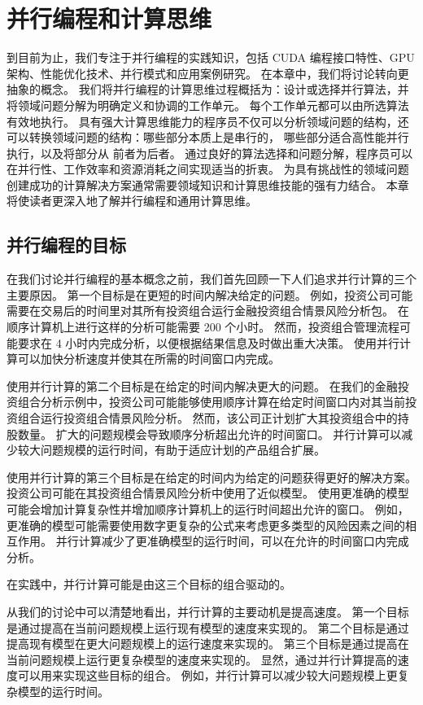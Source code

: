 \section{并行编程和计算思维}
到目前为止，我们专注于并行编程的实践知识，包括 CUDA 编程接口特性、GPU 架构、性能优化技术、并行模式和应用案例研究。 
在本章中，我们将讨论转向更抽象的概念。 
我们将并行编程的计算思维过程概括为：设计或选择并行算法，并将领域问题分解为明确定义和协调的工作单元。
每个工作单元都可以由所选算法有效地执行。 
具有强大计算思维能力的程序员不仅可以分析领域问题的结构，还可以转换领域问题的结构：哪些部分本质上是串行的，
哪些部分适合高性能并行执行，以及将部分从 前者为后者。 
通过良好的算法选择和问题分解，程序员可以在并行性、工作效率和资源消耗之间实现适当的折衷。 
为具有挑战性的领域问题创建成功的计算解决方案通常需要领域知识和计算思维技能的强有力结合。 
本章将使读者更深入地了解并行编程和通用计算思维。

\subsection{并行编程的目标}
在我们讨论并行编程的基本概念之前，我们首先回顾一下人们追求并行计算的三个主要原因。 
第一个目标是在更短的时间内解决给定的问题。 
例如，投资公司可能需要在交易后的时间里对其所有投资组合运行金融投资组合情景风险分析包。 
在顺序计算机上进行这样的分析可能需要 200 个小时。 
然而，投资组合管理流程可能要求在 4 小时内完成分析，以便根据结果信息及时做出重大决策。 
使用并行计算可以加快分析速度并使其在所需的时间窗口内完成。

使用并行计算的第二个目标是在给定的时间内解决更大的问题。 
在我们的金融投资组合分析示例中，投资公司可能能够使用顺序计算在给定时间窗口内对其当前投资组合运行投资组合情景风险分析。 
然而，该公司正计划扩大其投资组合中的持股数量。 扩大的问题规模会导致顺序分析超出允许的时间窗口。 
并行计算可以减少较大问题规模的运行时间，有助于适应计划的产品组合扩展。

使用并行计算的第三个目标是在给定的时间内为给定的问题获得更好的解决方案。 
投资公司可能在其投资组合情景风险分析中使用了近似模型。 
使用更准确的模型可能会增加计算复杂性并增加顺序计算机上的运行时间超出允许的窗口。 
例如，更准确的模型可能需要使用数字更复杂的公式来考虑更多类型的风险因素之间的相互作用。 
并行计算减少了更准确模型的运行时间，可以在允许的时间窗口内完成分析。

在实践中，并行计算可能是由这三个目标的组合驱动的。

从我们的讨论中可以清楚地看出，并行计算的主要动机是提高速度。 
第一个目标是通过提高在当前问题规模上运行现有模型的速度来实现的。 
第二个目标是通过提高现有模型在更大问题规模上的运行速度来实现的。 
第三个目标是通过提高在当前问题规模上运行更复杂模型的速度来实现的。 
显然，通过并行计算提高的速度可以用来实现这些目标的组合。 
例如，并行计算可以减少较大问题规模上更复杂模型的运行时间。

